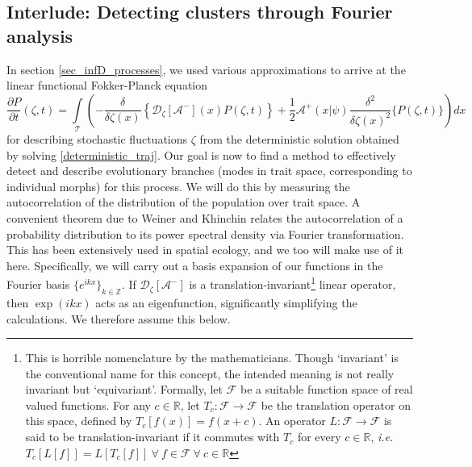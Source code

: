 \subsection{Interlude: Detecting clusters through Fourier analysis}

In section \ref{sec_infD_processes}, we used various approximations to arrive at the linear functional Fokker-Planck equation
\begin{equation}
\label{functional_WNE_chap_4}
    \frac{\partial P}{\partial t}(\zeta,t) = \int\limits_{\mathcal{T}}\left(-\frac{\delta}{\delta \zeta(x)}\left\{\mathcal{D}_{\zeta}[\mathcal{A}^{-}](x)P(\zeta,t)\right\}+\frac{1}{2}\mathcal{A}^{+}(x|\psi)\frac{\delta^2}{\delta\zeta(x)^2}\{P(\zeta,t)\}\right)dx
\end{equation}
for describing stochastic fluctuations $\zeta$ from the deterministic solution obtained by solving \eqref{deterministic_traj}. Our goal is now to find a method to effectively detect and describe evolutionary branches (modes in trait space, corresponding to individual morphs) for this process. We will do this by measuring the autocorrelation of the distribution of the population over trait space. A convenient theorem due to Weiner and Khinchin relates the autocorrelation of a probability distribution to its power spectral density via Fourier transformation. This has been extensively used in spatial ecology, and we too will make use of it here. Specifically, we will carry out a basis expansion of our functions in the Fourier basis $\{e^{ikx}\}_{k\in\mathbb{Z}}$. If $\mathcal{D}_{\zeta}[\mathcal{A}^{-}]$ is a translation-invariant\footnote{This is horrible nomenclature by the mathematicians. Though `invariant' is the conventional name for this concept, the intended meaning is not really invariant but `equivariant'. Formally, let $\mathcal{F}$ be a suitable function space of real valued functions. For any $c \in \mathbb{R}$, let $T_c: \mathcal{F} \to \mathcal{F}$ be the translation operator on this space, defined by $T_c[f(x)] = f(x+c)$. An operator $L: \mathcal{F} \to \mathcal{F}$ is said to be translation-invariant if it commutes with $T_c$ for every $c \in \mathbb{R}$, \emph{i.e.} $T_c[L[f]] = L[T_c[f]] \ \forall \ f \in \mathcal{F} \ \forall \ c \in \mathbb{R}$} linear operator, then $\exp(ikx)$ acts as an eigenfunction, significantly simplifying the calculations. We therefore assume this below.



%

